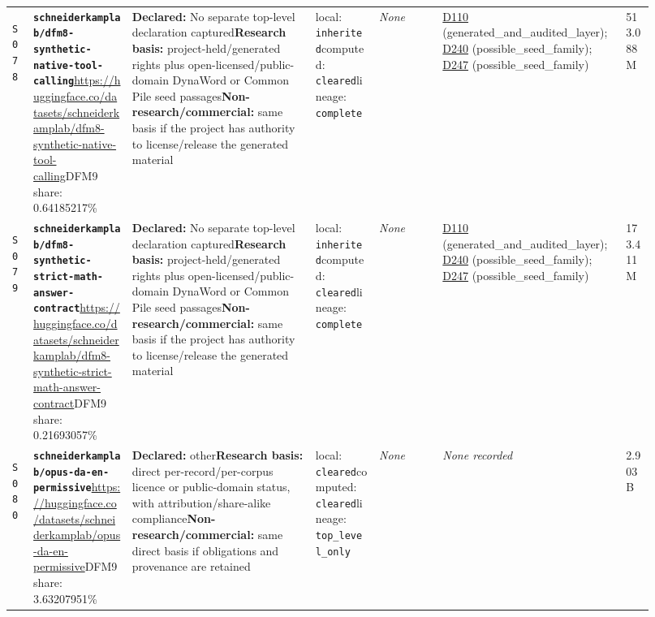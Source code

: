 \documentclass[9pt,a4paper]{article}
\newcommand{\srcid}[1]{\hypertarget{src:#1}{\texttt{#1}}}
\begin{document}
\begin{landscape}
\begin{longtable}{@{}L{0.03\linewidth}L{0.14\linewidth}L{0.26\linewidth}L{0.09\linewidth}L{0.09\linewidth}L{0.265\linewidth}L{0.045\linewidth}@{}}
\srcid{S078} & \textbf{\nolinkurl{schneiderkamplab/dfm8-synthetic-native-tool-calling}}\newline \url{https://huggingface.co/datasets/schneiderkamplab/dfm8-synthetic-native-tool-calling}\newline DFM9 share: 0.64185217\% & \textbf{Declared:} No separate top-level declaration captured\newline \textbf{Research basis:} project-held/generated rights plus open-licensed/public-domain DynaWord or Common Pile seed passages\newline \textbf{Non-research/commercial:} same basis if the project has authority to license/release the generated material & local: \texttt{inherited}\newline computed: \texttt{cleared}\newline lineage: \texttt{complete} & \textit{None} & \hyperlink{dep:D110}{D110} (generated\_and\_audited\_layer); \hyperlink{dep:D240}{D240} (possible\_seed\_family); \hyperlink{dep:D247}{D247} (possible\_seed\_family) & 513.088M \\
\srcid{S079} & \textbf{\nolinkurl{schneiderkamplab/dfm8-synthetic-strict-math-answer-contract}}\newline \url{https://huggingface.co/datasets/schneiderkamplab/dfm8-synthetic-strict-math-answer-contract}\newline DFM9 share: 0.21693057\% & \textbf{Declared:} No separate top-level declaration captured\newline \textbf{Research basis:} project-held/generated rights plus open-licensed/public-domain DynaWord or Common Pile seed passages\newline \textbf{Non-research/commercial:} same basis if the project has authority to license/release the generated material & local: \texttt{inherited}\newline computed: \texttt{cleared}\newline lineage: \texttt{complete} & \textit{None} & \hyperlink{dep:D110}{D110} (generated\_and\_audited\_layer); \hyperlink{dep:D240}{D240} (possible\_seed\_family); \hyperlink{dep:D247}{D247} (possible\_seed\_family) & 173.411M \\
\srcid{S080} & \textbf{\nolinkurl{schneiderkamplab/opus-da-en-permissive}}\newline \url{https://huggingface.co/datasets/schneiderkamplab/opus-da-en-permissive}\newline DFM9 share: 3.63207951\% & \textbf{Declared:} other\newline \textbf{Research basis:} direct per-record/per-corpus licence or public-domain status, with attribution/share-alike compliance\newline \textbf{Non-research/commercial:} same direct basis if obligations and provenance are retained & local: \texttt{cleared}\newline computed: \texttt{cleared}\newline lineage: \texttt{top\_level\_only} & \textit{None} & \textit{None recorded} & 2.903B \\

\end{longtable}
\end{landscape}
\end{document}
